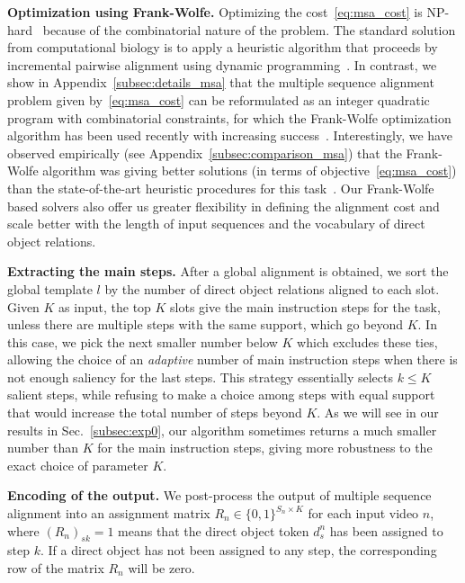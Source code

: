 \documentclass[10pt,twocolumn,letterpaper]{article}
\begin{document}
\textbf{Optimization using Frank-Wolfe.} 
Optimizing the cost~\eqref{eq:msa_cost} is NP-hard~\cite{wang1994msaNPhard} 
because of the combinatorial nature of the problem. The standard
solution from computational biology is to apply a heuristic algorithm that proceeds by incremental pairwise alignment using dynamic programming~\cite{Lee01poa}.
In contrast, we show in Appendix~\ref{subsec:details_msa} that the multiple sequence alignment problem given by~\eqref{eq:msa_cost} can be reformulated as an integer quadratic program with combinatorial constraints, for which the Frank-Wolfe optimization algorithm has been used recently with increasing success~\cite{Bojanowski14weakly,Jaggi2013,Joulin14efficient,Lacoste15GlobalLinearFW}. 
Interestingly, we have observed empirically (see Appendix~\ref{subsec:comparison_msa}) that
the Frank-Wolfe algorithm was giving better solutions (in terms of objective~\eqref{eq:msa_cost}) than the state-of-the-art heuristic procedures for this task~\cite{Higgins88clustal,Lee01poa}. Our Frank-Wolfe based solvers also offer us greater flexibility in defining the alignment cost and scale better with the length of input sequences and the vocabulary of direct object relations. 
%

\textbf{Extracting the main steps.}
After a global alignment is obtained, we sort the global template $l$
by the number of direct object relations aligned to each slot. Given
$K$ as input, the top $K$ slots give the main instruction steps for
the task, unless there are multiple steps with the same support, which
go beyond $K$. In this case, we pick the next smaller number below $K$
which excludes these ties, allowing the choice of an \emph{adaptive}
number of main instruction steps when there is not enough saliency for
the last steps.  This strategy essentially selects $k\leq K$ salient
steps, while refusing to make a choice among steps with equal support
that would increase the total number of steps beyond $K$.  As we will
see in our results in Sec.~\ref{subsec:exp0}, our algorithm
sometimes returns a much smaller number than $K$ for the main
instruction steps, giving more robustness to the exact choice of
parameter $K$.

\textbf{Encoding of the output.}
We post-process the output of multiple sequence alignment into an assignment matrix $R_n \in \{0, 1\}^{S_n \times K}$ for each input video $n$, 
where $(R_n)_{sk} = 1$ means that the direct object token $d^n_s$ has been assigned to step $k$. 
If a direct object has not been assigned to any step, the corresponding row of the matrix $R_n$ will be zero.
\end{document}

